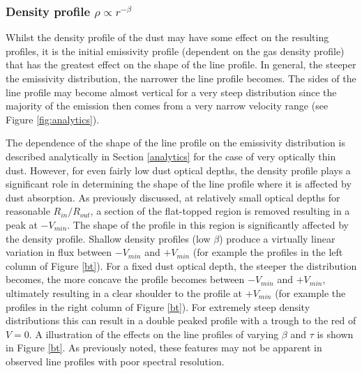 \documentclass[useAMS,usenatbib,usegraphicx]{mnras}
\begin{document}






\subsubsection{Density profile $\rho \propto r^{-\beta}$}
\label{beta}

Whilst the density profile of the dust may have some effect on the 
resulting profiles, it is the initial emissivity profile (dependent on the 
gas density profile) that has the greatest effect on the shape of 
the line profile.  In general, the steeper the emissivity distribution, the narrower the line 
profile becomes.  The sides of the line profile may become almost vertical 
for a very steep distribution since the majority of the emission then 
comes from a very narrow velocity range (see Figure \ref{fig:analytics}).  

The dependence of the shape of the line profile on the emissivity distribution
is described analytically in Section \ref{analytics} for the case of very optically thin dust.  However, for even fairly low dust optical depths, the density profile  plays a significant role in determining the shape of the line profile where it is affected by dust absorption.  As previously discussed, at relatively small optical depths for reasonable $R_{in}/R_{out}$, 
a section of the flat-topped region is removed resulting in a peak at 
$-V_{min}$.  The shape of the profile in this region is significantly 
affected by the density profile.  Shallow density profiles (low $\beta$) produce a virtually 
linear variation in flux between $-V_{min}$ and $+V_{min}$ (for example the profiles in the left column of Figure \ref{bt}).  For a fixed dust
optical depth, the steeper the distribution becomes, the more concave the 
profile becomes between $-V_{min}$ and $+V_{min}$, ultimately resulting in 
a clear shoulder to the profile at $+V_{min}$  (for example the profiles in the right column of Figure \ref{bt}).  For extremely steep density
distributions this can result in a double peaked profile with 
a trough to the red of $V=0$.  A illustration of the effects on the line profiles of varying $\beta$ and $\tau$  is shown in Figure \ref{bt}.  As previously noted, these features may not be apparent in observed line profiles with poor spectral resolution.
\end{document}

